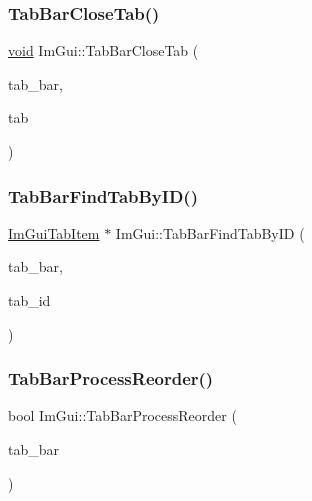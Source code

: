 \subsubsection{\texorpdfstring{Tab\+Bar\+Close\+Tab()}{TabBarCloseTab()}}
{\footnotesize\ttfamily \hyperlink{imgui__impl__opengl3__loader_8h_ac668e7cffd9e2e9cfee428b9b2f34fa7}{void} Im\+Gui\+::\+Tab\+Bar\+Close\+Tab (\begin{DoxyParamCaption}\item[{\hyperlink{structImGuiTabBar}{Im\+Gui\+Tab\+Bar} $\ast$}]{tab\+\_\+bar,  }\item[{\hyperlink{structImGuiTabItem}{Im\+Gui\+Tab\+Item} $\ast$}]{tab }\end{DoxyParamCaption})}

\mbox{\label{namespaceImGui_a892525a74a6206eabbeb851071b3119a}} 
\subsubsection{\texorpdfstring{Tab\+Bar\+Find\+Tab\+By\+I\+D()}{TabBarFindTabByID()}}
{\footnotesize\ttfamily \hyperlink{structImGuiTabItem}{Im\+Gui\+Tab\+Item} $\ast$ Im\+Gui\+::\+Tab\+Bar\+Find\+Tab\+By\+ID (\begin{DoxyParamCaption}\item[{\hyperlink{structImGuiTabBar}{Im\+Gui\+Tab\+Bar} $\ast$}]{tab\+\_\+bar,  }\item[{Im\+Gui\+ID}]{tab\+\_\+id }\end{DoxyParamCaption})}

\mbox{\label{namespaceImGui_aabf7c33f50ff3dc01b14fb19578252ee}} 
\subsubsection{\texorpdfstring{Tab\+Bar\+Process\+Reorder()}{TabBarProcessReorder()}}
{\footnotesize\ttfamily bool Im\+Gui\+::\+Tab\+Bar\+Process\+Reorder (\begin{DoxyParamCaption}\item[{\hyperlink{structImGuiTabBar}{Im\+Gui\+Tab\+Bar} $\ast$}]{tab\+\_\+bar }\end{DoxyParamCaption})}


